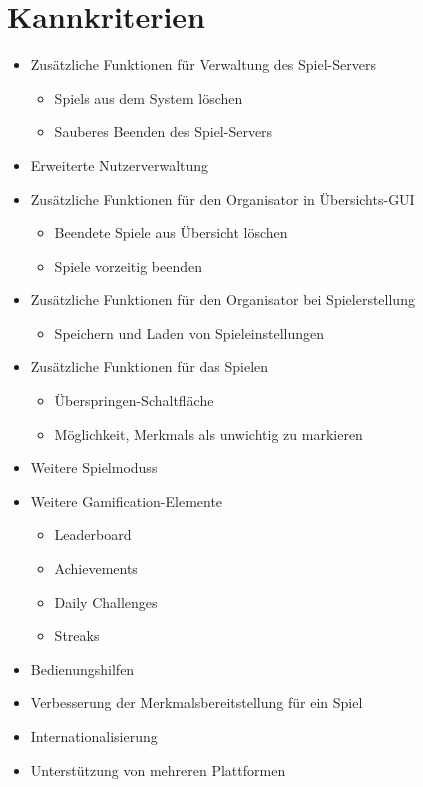 \documentclass[a4paper]{scrreprt}
\begin{document}
    \section{Kannkriterien}
    \begin{itemize} %
    	\item Zusätzliche Funktionen für Verwaltung des \Gls{Spiel-Server}s
   	\begin{itemize}
            \item \Glspl{Spiel} aus dem System löschen
            \item Sauberes Beenden des \Gls{Spiel-Server}s
        \end{itemize}
	\item Erweiterte Nutzerverwaltung
	\item Zusätzliche Funktionen für den \Gls{Organisator} in Übersichts-GUI
        \begin{itemize}
            \item Beendete Spiele aus Übersicht löschen
            \item Spiele vorzeitig beenden 
        \end{itemize}
	\item Zusätzliche Funktionen für den \Gls{Organisator} bei Spielerstellung
        \begin{itemize}
            \item Speichern und Laden von \Gls{Spieleinstellungen}
        \end{itemize}
        \item Zusätzliche Funktionen für das Spielen 
        \begin{itemize}
            \item Überspringen-Schaltfläche 
            \item Möglichkeit, \Glspl{Merkmal} als unwichtig zu markieren 
        \end{itemize}
	\item Weitere \Glspl{Spielmodus}
	\item Weitere Gamification-Elemente
        \begin{itemize}
            \item Leaderboard %
            \item \Glspl{Achievement}
            \item Daily Challenges %
            \item Streaks %
        \end{itemize}
        \item Bedienungshilfen 
        \item Verbesserung der Merkmalsbereitstellung für ein \Gls{Spiel}
        \item Internationalisierung 
        \item Unterstützung von mehreren Plattformen
    \end{itemize}
\end{document}
